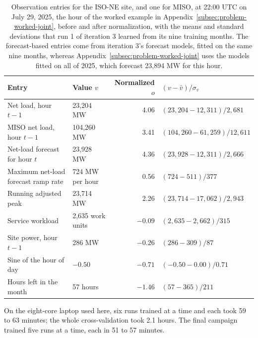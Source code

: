 \documentclass{UNCC-thesis}
\begin{document}
\begin{table}[htbp]
  \centering
  \footnotesize
  \caption[Observation entries before and after normalization]{Observation entries
  for the ISO-NE site, and one for MISO, at 22:00 UTC on July 29, 2025, the
  hour of the worked example in Appendix~\ref{subsec:problem-worked-joint}, before and after
  normalization, with the means and standard deviations that run 1 of iteration 3
  learned from its nine training months. The forecast-based entries come from iteration 3's
  forecast models, fitted on the same nine months, whereas
  Appendix~\ref{subsec:problem-worked-joint} uses the models fitted on all of 2025, which
  forecast 23,894 MW for this hour.}
  \label{tab:observation-example}
  \begin{tabular}{@{}L{0.30\textwidth}L{0.19\textwidth}rL{0.30\textwidth}@{}}
    \toprule
    Entry & Value \(v\) & Normalized \(o\) & \((v-\bar v)/\sigma_v\) \\
    \midrule
    Net load, hour \(t-1\) & 23,204 MW & 4.06 & \((23{,}204-12{,}311)/2{,}681\) \\
    MISO net load, hour \(t-1\) & 104,260 MW & 3.41 & \((104{,}260-61{,}259)/12{,}611\) \\
    Net-load forecast for hour \(t\) & 23,928 MW & 4.36 & \((23{,}928-12{,}311)/2{,}666\) \\
    Maximum net-load forecast ramp rate & 724 MW per hour & 0.56 & \((724-511)/377\) \\
    Running adjusted peak & 23,714 MW & 2.26 & \((23{,}714-17{,}062)/2{,}943\) \\
    Service workload & 2,635 work units & \(-0.09\) & \((2{,}635-2{,}662)/315\) \\
    Site power, hour \(t-1\) & 286 MW & \(-0.26\) & \((286-309)/87\) \\
    Sine of the hour of day & \(-0.50\) & \(-0.71\) & \((-0.50-0.00)/0.71\) \\
    Hours left in the month & 57 hours & \(-1.46\) & \((57-365)/211\) \\
    \bottomrule
  \end{tabular}
\end{table}

On the eight-core laptop used here, six runs trained at a time and each took
59 to 63 minutes; the whole cross-validation took 2.1 hours. The final
campaign trained five runs at a time, each in 51 to 57 minutes.
\end{document}
